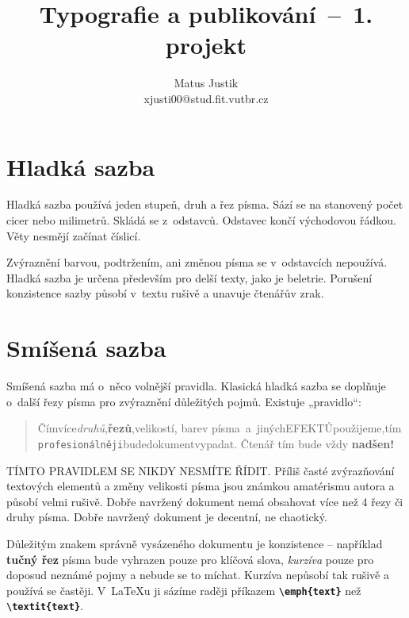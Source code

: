 \documentclass[twocolumn]{article}
\title{Typografie a publikování \,--\, 1. projekt}
\author{Matus Justik \\ xjusti00@stud.fit.vutbr.cz}
\date{}
\begin{document}
  \maketitle

  \section{Hladká sazba}
    Hladká sazba používá jeden stupeň, druh a řez písma. Sází
    se na stanovený počet cicer nebo milimetrů. Skládá se z~odstavců. 
    Odstavec končí východovou řádkou. Věty nesmějí
    začínat číslicí.\par
    
    Zvýraznění barvou, podtržením, ani změnou písma se
    v~odstavcích nepoužívá. Hladká sazba je určena především
    pro delší texty, jako je beletrie. Porušení konzistence sazby
    působí v~textu rušivě a unavuje čtenářův zrak.

  
  \section{Smíšená sazba}
  Smíšená sazba má o~něco volnější pravidla. Klasická hladká sazba se doplňuje o~další řezy písma pro zvýraznění důležitých pojmů. Existuje „pravidlo“:
\begin{quotation}
Čím\hfill více\hfill \textit{druhů},\hfill \textbf{řezů},\hfill \tiny velikostí\normalsize,\hfill \color{red} barev \color{black}\hfill
písma~\hfill a~\hfill jiných\hfill \footnotesize EFEKTŮ\hfill \normalsize použijeme,\hfill tím\hfill
\texttt{profesionálněji}\hfill bude\hfill \Large{\selectfont dokument}\hfill\normalsize vypadat.\hfill
\huge Č\LARGE t\Large e\large n\normalsize á\small ř \footnotesize t\scriptsize í\tiny m \normalsize bude vždy \Huge \textbf{nadšen!} \normalsize
\end{quotation}
\par T\footnotesize ÍMTO PRAVIDLEM SE NIKDY NESMÍTE ŘÍDIT. \normalsize Příliš
časté zvýrazňování textových elementů a změny velikosti
písma jsou známkou amatérismu autora a působí velmi rušivě. Dobře navržený dokument nemá obsahovat více než 4 řezy či druhy písma. Dobře navržený dokument je decentní, ne chaotický.\par

Důležitým znakem správně vysázeného dokumentu je
konzistence – například \textbf{tučný řez} písma bude vyhrazen
pouze pro klíčová slova, \textit{kurzíva} pouze pro doposud neznámé pojmy a nebude se to míchat. Kurzíva nepůsobí tak rušivě a používá se častěji. V~\LaTeX u ji sázíme raději
příkazem \textbf{\texttt{\textbackslash emph\{text\}}} než \textbf{\texttt{\textbackslash textit\{text\}}}.\par
\end{document}
